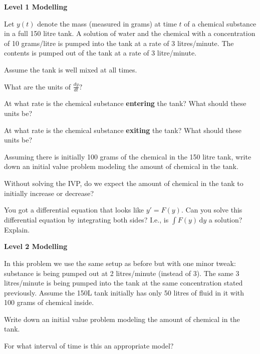\documentclass{workbook}
\begin{document}
\begin{slide}
	{\bfseries Level 1 Modelling}

	\question
	Let $y(t)$ denote the mass (measured in grams) at time $t$ of
	a chemical substance in a  full 150 litre tank. A solution of
	water and the chemical with a concentration of 10 grams/litre
	is pumped into the tank at a rate of 3 litres/minute. The contents is pumped out
	of  the tank at a rate of 3 litre/minute.

	Assume
	the tank is well mixed at all times.

	\begin{parts} 
		
	\item What are the units of $\frac{dy}{dt}?$
    

    \item At what rate is the chemical substance \textbf{entering} the tank? What should these units be?


    \item At what rate is the chemical substance \textbf{exiting} the tank? What should these units be?
    

    \item Assuming there is initially 100 grams of the chemical in the 150 litre tank, write down an initial value problem modeling the amount of chemical in the tank.


    \item Without solving the IVP, do we expect the amount of chemical in the tank to initially increase or decrease?

	\item You got a differential equation that looks like $y'=F(y)$. Can you solve this differential equation by integrating both sides? I.e., is $\displaystyle \int F(y)\,\mathrm d y$ a solution? Explain.


	\end{parts}

\end{slide}

\begin{slide}
	{\bfseries Level 2 Modelling}

	\question
	In this problem we use the same setup as before but with one minor tweak: substance is being pumped out at 2 litres/minute (instead of 3). The same 3 litres/minute is being pumped into the tank at the same concentration stated previously. Assume the 150L tank initially has only 50 litres of fluid in it with 100 grams of chemical inside.

	\begin{parts} 
		
    \item Write down an initial value problem modeling the amount of chemical in the tank.


    \item For what interval of time is this an appropriate model?

	\end{parts}

\end{slide}
\end{document}
